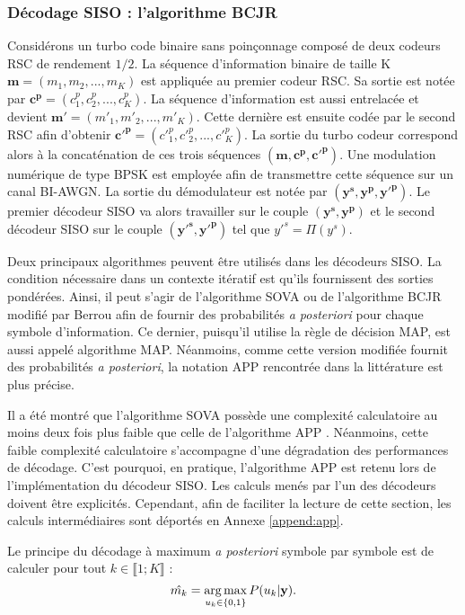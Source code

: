 \subsubsection{Décodage SISO : l'algorithme BCJR}\label{sec:BCJR}
Considérons un turbo code binaire sans poinçonnage composé de deux codeurs RSC de rendement $1/2$. La séquence d'information 
binaire de taille K $\mathbf{m} = (m_1, m_2, ..., m_K)$ est appliquée au premier codeur RSC. Sa sortie est notée par 
$\mathbf{c^p} = (c^p_1, c^p_2, ..., c^p_K)$. La séquence d'information est aussi entrelacée et devient 
$\mathbf{m'} = (m'_1, m'_2, ..., m'_K)$. Cette dernière est ensuite codée par le second RSC afin d'obtenir 
$\mathbf{c'^p} = (c'^p_1, c'^p_2, ..., c'^p_K)$. La sortie du turbo codeur correspond alors à la concaténation de ces trois 
séquences $(\mathbf{m}, \mathbf{c^p}, \mathbf{c'^p})$. Une modulation numérique de type BPSK est employée afin de 
transmettre cette séquence sur un canal BI-AWGN. La sortie du démodulateur est notée par $(\mathbf{y^s},\mathbf{y^p},\mathbf{y'^p})$. 
Le premier décodeur SISO va alors travailler sur le couple $(\mathbf{y^s},\mathbf{y^p})$ et le second décodeur SISO sur le 
couple $(\mathbf{y'^s},\mathbf{y'^p})$ tel que $y'^s = \Pi(y^s)$.

Deux principaux algorithmes peuvent être utilisés dans les décodeurs SISO. La condition nécessaire dans un contexte itératif 
est qu'ils fournissent des sorties pondérées. Ainsi, il peut s'agir de l'algorithme SOVA ou de l'algorithme BCJR modifié 
par Berrou \cite{berrouTC} afin de fournir des probabilités \textit{a posteriori} pour chaque symbole d'information. Ce 
dernier, puisqu'il utilise la règle de décision MAP, est aussi appelé  algorithme MAP. Néanmoins, comme cette version 
modifiée fournit des probabilités \textit{a posteriori}, la notation APP rencontrée dans la littérature est plus précise.

Il a été montré que l'algorithme SOVA possède une complexité calculatoire au moins deux fois plus faible que celle de 
l'algorithme APP \cite{robertson1995comparison}. Néanmoins, cette faible complexité calculatoire s'accompagne d'une 
dégradation des performances de décodage. C'est pourquoi, en pratique, l'algorithme APP est retenu lors de l'implémentation 
du décodeur SISO. Les calculs menés par l'un des décodeurs doivent être explicités. Cependant, afin de faciliter la 
lecture de cette section, les calculs intermédiaires sont déportés en Annexe \ref{append:app}.

Le principe du décodage à maximum \textit{a posteriori} symbole par symbole est de calculer pour tout $k\in \llbracket1;K\rrbracket$ : 
\begin{equation}
	\label{eq:maprule}
	\hat{m_k} = \operatorname*{arg\,max}\limits_{u_k\in\{0,1\}} P(u_k| \mathbf{y}).	
\end{equation}


